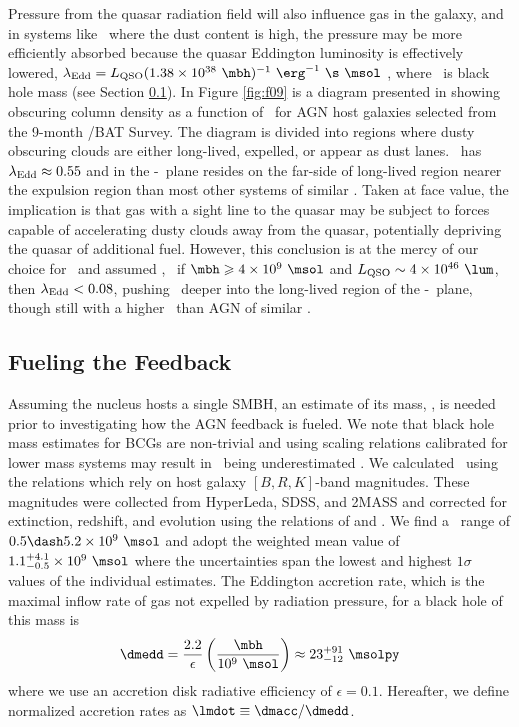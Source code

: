 \documentclass[useAMS,usenatbib]{mn2e}
\begin{document}
Pressure from the quasar radiation field will also influence gas in
the galaxy, and in systems like \irs\ where the dust content is high,
the pressure may be more efficiently absorbed because the quasar
Eddington luminosity is effectively lowered, $\leff = \lqso (1.38
\times 10^{38} ~\mbh)^{-1} ~\erg^{-1} ~\s ~\msol$
\citep[\eg][]{1993ApJ...402..441L}, where \mbh\ is black hole mass
(see Section \ref{sec:fuel}). In Figure \ref{fig:f09} is a diagram
presented in \citet{2009MNRAS.394L..89F} showing obscuring column
density as a function of \leff\ for AGN host galaxies selected from
the 9-month \swift/BAT Survey. The diagram is divided into regions
where dusty obscuring clouds are either long-lived, expelled, or
appear as dust lanes. \irs\ has $\lambda_{\rm{Edd}} \approx 0.55$ and in the
\nhobs-\leff\ plane resides on the far-side of long-lived region
nearer the expulsion region than most other systems of similar \nhobs.
Taken at face value, the implication is that gas with a sight line to
the quasar may be subject to forces capable of accelerating dusty
clouds away from the quasar, potentially depriving the quasar of
additional fuel. However, this conclusion is at the mercy of our
choice for \mbh\ and assumed \lqso, \ie\ if $\mbh \ge 4 \times 10^9
~\msol$ and $\lqso \sim 4 \times 10^{46} ~\lum$, then $\lambda_{\rm{Edd}} < 0.08$,
pushing \irs\ deeper into the long-lived region of the
\nhobs-\leff\ plane, though still with a higher \leff\ than AGN of
similar \nhobs.

\subsection{Fueling the Feedback}
\label{sec:fuel}

Assuming the nucleus hosts a single SMBH, an estimate of its mass,
\mbh, is needed prior to investigating how the AGN feedback is
fueled. We note that black hole mass estimates for BCGs are
non-trivial and using scaling relations calibrated for lower mass
systems may result in \mbh\ being underestimated
\citep[\eg][]{2007ApJ...662..808L, 2009ApJ...690..537D}. We calculated
\mbh\ using the \citet{2007MNRAS.379..711G} relations which rely on
host galaxy $[B,R,K]$-band magnitudes. These magnitudes were collected
from HyperLeda, SDSS, and 2MASS and corrected for extinction,
redshift, and evolution using the relations of \citet{cardelli89} and
\citet{poggianti97}. We find a \mbh\ range of $0.5 \dash 5.2 \times
10^9 ~\msol$ and adopt the weighted mean value of $1.1^{+4.1}_{-0.5}
\times 10^9 ~\msol$ where the uncertainties span the lowest and
highest $1\sigma$ values of the individual estimates. The Eddington
accretion rate, which is the maximal inflow rate of gas not expelled
by radiation pressure, for a black hole of this mass is
\begin{equation}
  \dmedd = \frac{2.2}{\epsilon} \left(\frac{\mbh}{10^9~\msol}\right)
  \approx 23^{+91}_{-12} ~\msolpy
\end{equation}
where we use an accretion disk radiative efficiency of $\epsilon =
0.1$. Hereafter, we define normalized accretion rates as $\lmdot
\equiv \dmacc/\dmedd$.
\end{document}

